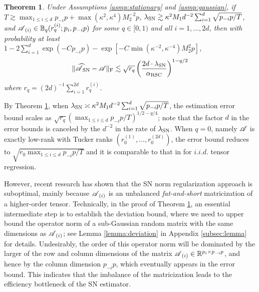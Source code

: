 \documentclass[12pt]{article}
\newtheorem{theorem}{Theorem}
\newcommand{\cm}[1]{\mbox{\boldmath$\mathscr{#1}$}}
\begin{document}
\begin{theorem} \label{thm:SN}
Under Assumptions \ref{asmp:stationary} and \ref{asmp:gaussian}, if $T\gtrsim \max_{1\leq i\leq d}p_{-i}p+\max(\kappa^2,\kappa^4)M_2^{-2}p$, $\lambda_{\textup{SN}}\gtrsim\kappa^2M_1d^{-2}\sum_{i=1}^{d}\sqrt{ p_{-i} p/T}$, and $\cm{A}_{(i)}\in\mathbb{B}_q(r_q^{(i)};p_i,p_{-i}p)$ for some $q\in[0,1)$ and all $i=1,\dots,2d$, then with probability at least $1-2\sum_{i=1}^{d}\exp(-Cp_{-i}p)-\exp[-C\min(\kappa^{-2},\kappa^{-4})M_2^2p]$,
	\begin{equation}
		\|\cm{\widehat{A}}_{\textup{SN}}-\cm{A}\|_{\textup{F}}\lesssim\sqrt{r_q}\left(\frac{2d\cdot\lambda_{\textup{SN}}}{\alpha_{\textup{RSC}}}\right)^{1-q/2}
	\end{equation}
	where $r_q=(2d)^{-1}\sum_{i=1}^{2d}r_q^{(i)}$.	
\end{theorem}


By Theorem \ref{thm:SN}, when $\lambda_{\textup{SN}}\asymp\kappa^2M_1d^{-2}\sum_{i=1}^{d}\sqrt{p_{-i} p/T}$, the estimation error bound scales as
$\sqrt{r_q}(\max_{1\leq i\leq d}p_{-i}p/T)^{1/2-q/4}$; note that the factor $d$ in the error bounds is canceled by the $d^{-2}$ in the rate of $\lambda_{\textup{SN}}$. When $q=0$, namely $\cm{A}$ is exactly low-rank with Tucker ranks $(r_0^{(1)},\dots,r_0^{(2d)})$, the error bound reduces to $\sqrt{r_0\max_{1\leq i\leq d}p_{-i}p/T}$ and it is comparable to that in \citet{tomioka2011statistical} for $i.i.d.$ tensor regression. 

However, recent research \citep[e.g.,][]{mu2014square,raskutti2019convex} has shown that the SN norm regularization approach is suboptimal, mainly because $\cm{A}_{(i)}$ is an unbalanced \textit{fat-and-short} matricization of a higher-order tensor.  Technically, in the proof of Theorem \ref{thm:SN}, an essential intermediate step is to establish the deviation bound, where we need to upper bound the operator norm of a sub-Gaussian random matrix with the same dimensions as $\cm{A}_{(i)}$; see  Lemma \ref{lemma:deviation} in Appendix \ref{subsec:lemma} for details. Undesirably,  the order of this operator norm  will be dominated by the larger of the  row and column dimensions of the matrix $\cm{A}_{(i)}\in\mathbb{R}^{p_i \times p_{-i}p}$, and hence by the column dimension $p_{-i}p$, which eventually appears in the  error bound.  This indicates that the imbalance of the matricization leads to the efficiency bottleneck of the SN estimator.
\end{document}
